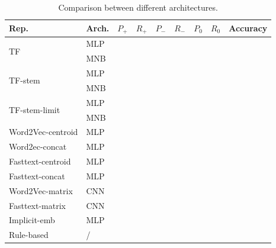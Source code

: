 \documentclass{../extra/aakpract/aakpract}
\begin{document}
\begin{table}[hpt]
	\centering
	\begin{tabular}{lllllllll}
		\hline\hline
		Rep. & Arch. & $ P_+ $ & $ R_+ $ & $ P_- $ & $ R_- $ & $ P_0 $ & $ R_0 $ & Accuracy \\
		\hline
		
		\multirow{2}{*}{TF} & MLP &  &  &  &  &  &  &  \\
		 & MNB &  &  &  &  &  &  &  \\
		
		\multirow{2}{*}{TF-stem} & MLP &  &  &  &  &  &  &  \\
		 & MNB &  &  &  &  &  &  &  \\
		
		\multirow{2}{*}{TF-stem-limit} & MLP &  &  &  &  &  &  &  \\
		 & MNB &  &  &  &  &  &  &  \\
		
		Word2Vec-centroid & MLP  &  &  &  &  &  &  &  \\
		Word2ec-concat & MLP  &  &  &  &  &  &  &  \\
		Fasttext-centroid & MLP  &  &  &  &  &  &  &  \\
		Fasttext-concat & MLP  &  &  &  &  &  &  &  \\
		Word2Vec-matrix & CNN  &  &  &  &  &  &  &  \\
		Fasttext-matrix & CNN  &  &  &  &  &  &  &  \\
		Implicit-emb & MLP  &  &  &  &  &  &  &  \\
		Rule-based & /  &  &  &  &  &  &  &  \\
		\hline\hline
	\end{tabular}
	\caption{Comparison between different architectures.}
	\label{tab:comp}
\end{table}
\end{document}
